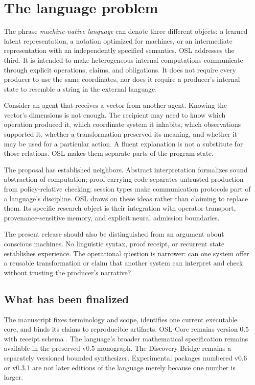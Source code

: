 \documentclass[11pt]{article}
\begin{document}
\section{The language problem}
The phrase \emph{machine-native language} can denote three different objects: a learned latent representation, a notation optimized for machines, or an intermediate representation with an independently specified semantics. OSL addresses the third. It is intended to make heterogeneous internal computations communicate through explicit operations, claims, and obligations. It does not require every producer to use the same coordinates, nor does it require a producer's internal state to resemble a string in the external language.

Consider an agent that receives a vector from another agent. Knowing the vector's dimensions is not enough. The recipient may need to know which operation produced it, which coordinate system it inhabits, which observations supported it, whether a transformation preserved its meaning, and whether it may be used for a particular action. A fluent explanation is not a substitute for those relations. OSL makes them separate parts of the program state.

The proposal has established neighbors. Abstract interpretation formalizes sound abstraction of computation; proof-carrying code separates untrusted production from policy-relative checking; session types make communication protocols part of a language's discipline. OSL draws on these ideas rather than claiming to replace them. Its specific research object is their integration with operator transport, provenance-sensitive memory, and explicit neural admission boundaries. \cite{cousot,necula,session}

The present release should also be distinguished from an argument about conscious machines. No linguistic syntax, proof receipt, or recurrent state establishes experience. The operational question is narrower: can one system offer a reusable transformation or claim that another system can interpret and check without trusting the producer's narrative?

\subsection{What has been finalized}
The manuscript fixes terminology and scope, identifies one current executable core, and binds its claims to reproducible artifacts. OSL-Core remains version 0.5 with receipt schema . The language's broader mathematical specification remains available in the preserved v0.5 monograph. The Discovery Bridge remains a separately versioned bounded synthesizer. Experimental packages numbered v0.6 or v0.3.1 are not later editions of the language merely because one number is larger. \cite{o03,o05,odb}
\end{document}
